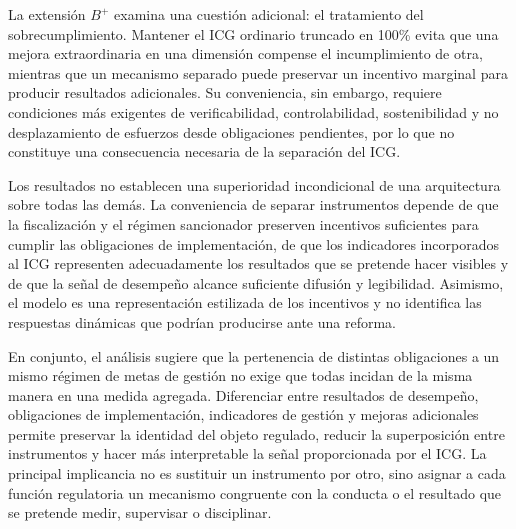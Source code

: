 La extensión \(B^{+}\) examina una cuestión adicional: el tratamiento del sobrecumplimiento. Mantener el ICG ordinario truncado en 100\% evita que una mejora extraordinaria en una dimensión compense el incumplimiento de otra, mientras que un mecanismo separado puede preservar un incentivo marginal para producir resultados adicionales. Su conveniencia, sin embargo, requiere condiciones más exigentes de verificabilidad, controlabilidad, sostenibilidad y no desplazamiento de esfuerzos desde obligaciones pendientes, por lo que no constituye una consecuencia necesaria de la separación del ICG.

Los resultados no establecen una superioridad incondicional de una arquitectura sobre todas las demás. La conveniencia de separar instrumentos depende de que la fiscalización y el régimen sancionador preserven incentivos suficientes para cumplir las obligaciones de implementación, de que los indicadores incorporados al ICG representen adecuadamente los resultados que se pretende hacer visibles y de que la señal de desempeño alcance suficiente difusión y legibilidad. Asimismo, el modelo es una representación estilizada de los incentivos y no identifica las respuestas dinámicas que podrían producirse ante una reforma.

En conjunto, el análisis sugiere que la pertenencia de distintas obligaciones a un mismo régimen de metas de gestión no exige que todas incidan de la misma manera en una medida agregada. Diferenciar entre resultados de desempeño, obligaciones de implementación, indicadores de gestión y mejoras adicionales permite preservar la identidad del objeto regulado, reducir la superposición entre instrumentos y hacer más interpretable la señal proporcionada por el ICG. La principal implicancia no es sustituir un instrumento por otro, sino asignar a cada función regulatoria un mecanismo congruente con la conducta o el resultado que se pretende medir, supervisar o disciplinar.